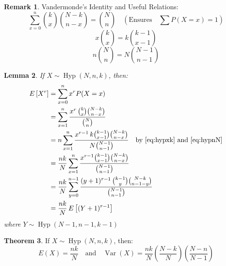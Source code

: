 \documentclass[12pt,a4paper]{report}
\theoremstyle{definition}
\newtheorem{thm}{Theorem}[section]
\newtheorem{remark}[thm]{Remark}
\theoremstyle{plain}
\newtheorem{lem}[thm]{Lemma}
\theoremstyle{definition}
\begin{document}
\begin{remark}
Vandermonde's Identity and Useful Relations:
\begin{equation}
\sum_{x = 0}^n \binom{k}{x}\binom{N-k}{n-x} = \binom{N}{n}\quad (\text{Ensures}\quad \sum P(X=x) = 1)
\end{equation}
\begin{equation}
\label{eq:hypxk}
x\binom{k}{x} = k\binom{k-1}{x - 1}
\end{equation}
\begin{equation}
\label{eq:hypnN}
n\binom{N}{n} = N\binom{N-1}{n-1}
\end{equation}
\end{remark}






\begin{lem}
If $X \sim \operatorname{Hyp}(N, n, k)$, then:
\begin{align*}
E\left[X^r\right] & = \sum^n_{x = 0}x^rP(X = x)\\
& = \sum^n_{x =1}\frac{x^r\, \binom{k}{x}\binom{N-k}{n-x}}{\binom{N}{n}}\\
& = n\sum^n_{x = 1}\frac{x^{r-1}\, k\binom{k-1}{x - 1}\binom{N-k}{n-x}}{N\binom{N-1}{n-1}}\quad\text{by \eqref{eq:hypxk} and \eqref{eq:hypnN}}\\
& = \frac{nk}{N}\sum^n_{x = 1}\frac{x^{r-1}\binom{k - 1}{x - 1}\binom{N - k}{n - x}}{\binom{N-1}{n-1}}\\
& = \frac{nk}{N}\sum^{n-1}_{y =0}\frac{(y + 1)^{r-1}\,\binom{k-1}{y}\binom{N-k}{n-1 - y}}{\binom{N-1}{n-1}}\\
& = \frac{nk}{N}\, E\left[(Y + 1)^{r-1}\right]
\end{align*}
where $Y \sim \operatorname{Hyp}(N-1, n-1, k-1)$
\end{lem}




\begin{thm}
If $X \sim \operatorname{Hyp}(N, n, k)$, then:\[ E(X) = \frac{nk}{N} \quad \text{and} \quad \operatorname{Var}(X) = \frac{nk}{N}\left(\frac{N-k}{N}\right)\left(\frac{N-n}{N-1}\right) \]
\end{thm}
\end{document}
